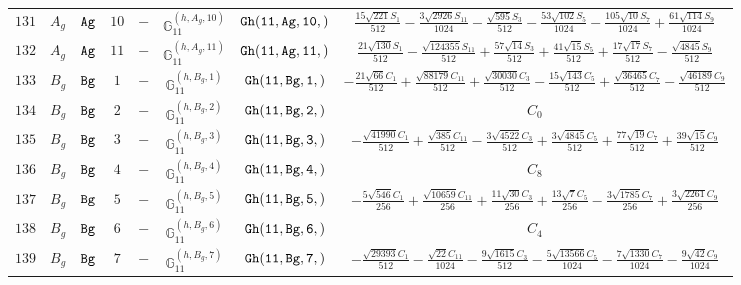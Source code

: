 \documentclass[fleqn,8pt]{jsarticle}
\begin{document}
\begin{table}[ht!]
\begin{center}
\begin{tabular}{cccccccc}
$ 131 $ & $ A_{g} $ & $ {\tt Ag} $ & $ 10 $ & $ - $ & $ \mathbb{G}_{11}^{(h,A_{g},10)} $ & $ {\tt Gh(11,Ag,10,)} $ & $ \frac{15 \sqrt{221} S_{1}}{512} - \frac{3 \sqrt{2926} S_{11}}{1024} - \frac{\sqrt{595} S_{3}}{512} - \frac{53 \sqrt{102} S_{5}}{1024} - \frac{105 \sqrt{10} S_{7}}{1024} + \frac{61 \sqrt{114} S_{9}}{1024} $ \\
$ 132 $ & $ A_{g} $ & $ {\tt Ag} $ & $ 11 $ & $ - $ & $ \mathbb{G}_{11}^{(h,A_{g},11)} $ & $ {\tt Gh(11,Ag,11,)} $ & $ \frac{21 \sqrt{130} S_{1}}{512} - \frac{\sqrt{124355} S_{11}}{512} + \frac{57 \sqrt{14} S_{3}}{512} + \frac{41 \sqrt{15} S_{5}}{512} + \frac{17 \sqrt{17} S_{7}}{512} - \frac{\sqrt{4845} S_{9}}{512} $ \\
$ 133 $ & $ B_{g} $ & $ {\tt Bg} $ & $ 1 $ & $ - $ & $ \mathbb{G}_{11}^{(h,B_{g},1)} $ & $ {\tt Gh(11,Bg,1,)} $ & $ - \frac{21 \sqrt{66} C_{1}}{512} + \frac{\sqrt{88179} C_{11}}{512} + \frac{\sqrt{30030} C_{3}}{512} - \frac{15 \sqrt{143} C_{5}}{512} + \frac{\sqrt{36465} C_{7}}{512} - \frac{\sqrt{46189} C_{9}}{512} $ \\
$ 134 $ & $ B_{g} $ & $ {\tt Bg} $ & $ 2 $ & $ - $ & $ \mathbb{G}_{11}^{(h,B_{g},2)} $ & $ {\tt Gh(11,Bg,2,)} $ & $ C_{0} $ \\
$ 135 $ & $ B_{g} $ & $ {\tt Bg} $ & $ 3 $ & $ - $ & $ \mathbb{G}_{11}^{(h,B_{g},3)} $ & $ {\tt Gh(11,Bg,3,)} $ & $ - \frac{\sqrt{41990} C_{1}}{512} + \frac{\sqrt{385} C_{11}}{512} - \frac{3 \sqrt{4522} C_{3}}{512} + \frac{3 \sqrt{4845} C_{5}}{512} + \frac{77 \sqrt{19} C_{7}}{512} + \frac{39 \sqrt{15} C_{9}}{512} $ \\
$ 136 $ & $ B_{g} $ & $ {\tt Bg} $ & $ 4 $ & $ - $ & $ \mathbb{G}_{11}^{(h,B_{g},4)} $ & $ {\tt Gh(11,Bg,4,)} $ & $ C_{8} $ \\
$ 137 $ & $ B_{g} $ & $ {\tt Bg} $ & $ 5 $ & $ - $ & $ \mathbb{G}_{11}^{(h,B_{g},5)} $ & $ {\tt Gh(11,Bg,5,)} $ & $ - \frac{5 \sqrt{546} C_{1}}{256} + \frac{\sqrt{10659} C_{11}}{256} + \frac{11 \sqrt{30} C_{3}}{256} + \frac{13 \sqrt{7} C_{5}}{256} - \frac{3 \sqrt{1785} C_{7}}{256} + \frac{3 \sqrt{2261} C_{9}}{256} $ \\
$ 138 $ & $ B_{g} $ & $ {\tt Bg} $ & $ 6 $ & $ - $ & $ \mathbb{G}_{11}^{(h,B_{g},6)} $ & $ {\tt Gh(11,Bg,6,)} $ & $ C_{4} $ \\
$ 139 $ & $ B_{g} $ & $ {\tt Bg} $ & $ 7 $ & $ - $ & $ \mathbb{G}_{11}^{(h,B_{g},7)} $ & $ {\tt Gh(11,Bg,7,)} $ & $ - \frac{\sqrt{29393} C_{1}}{512} - \frac{\sqrt{22} C_{11}}{1024} - \frac{9 \sqrt{1615} C_{3}}{512} - \frac{5 \sqrt{13566} C_{5}}{1024} - \frac{7 \sqrt{1330} C_{7}}{1024} - \frac{9 \sqrt{42} C_{9}}{1024} $ \\

\end{tabular}
\end{center}
\end{table}
\end{document}
